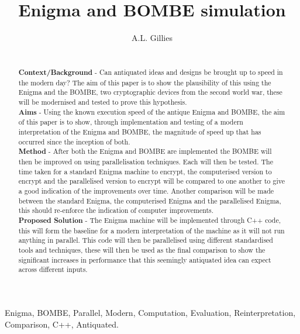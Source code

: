 \documentclass[12pt,a4paper]{article}
\title{Enigma and BOMBE simulation}
\author{A.L. Gillies}
\date{}
\begin{document}
\maketitle

\begin{abstract}\\

{\bf Context/Background} - Can antiquated ideas and designs be brought up to speed in the modern day? The aim of this paper is to show the plausibility of this using the Enigma and the BOMBE, two cryptographic devices from the second world war, these will be modernised and tested to prove this hypothesis.\\

{\bf Aims} - Using the known execution speed of the antique Enigma and BOMBE, the aim of this paper is to show, through implementation and testing of a modern interpretation of the Enigma and BOMBE, the magnitude of speed up that has occurred since the inception of both.\\

{\bf Method} - After both the Enigma and BOMBE are implemented the BOMBE will then be improved on using parallelisation techniques. Each will then be tested. The time taken for a standard Enigma machine to encrypt, the computerised version to encrypt and the parallelised version to encrypt will be compared to one another to give a good indication of the improvements over time. Another comparison will be made between the standard Enigma, the computerised Enigma and the parallelised Enigma, this should re-enforce the indication of computer improvements.\\

{\bf Proposed Solution} - The Enigma machine will be implemented through C++ code, this will form the baseline for a modern interpretation of the machine as it will not run anything in parallel. This code will then be parallelised using different standardised tools and techniques, these will then be used as the final comparison to show the significant increases in performance that this seemingly antiquated idea can expect across different inputs.\\
\end{abstract}

\begin{keywords}
Enigma, BOMBE, Parallel, Modern, Computation, Evaluation, Reinterpretation, Comparison, C++, Antiquated.
\end{keywords}
\end{document}
